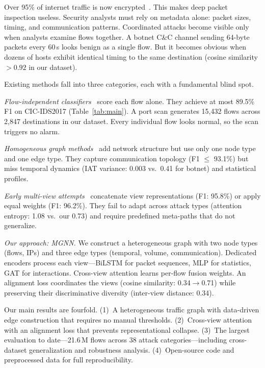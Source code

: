 \documentclass[conference]{IEEEtran}
\begin{document}
Over 95\% of internet traffic is now encrypted~\cite{google2024https}. This makes deep packet inspection useless. Security analysts must rely on metadata alone: packet sizes, timing, and communication patterns. Coordinated attacks become visible only when analysts examine flows together. A botnet C\&C channel sending 64-byte packets every 60\,s looks benign as a single flow. But it becomes obvious when dozens of hosts exhibit identical timing to the same destination (cosine similarity $>0.92$ in our dataset).

Existing methods fall into three categories, each with a fundamental blind spot.

\textit{Flow-independent classifiers}~\cite{sharafaldin2018cic,chen2016xgboost,lotfollahi2020deep,mirsky2018kitsune} score each flow alone. They achieve at most 89.5\% F1 on CIC-IDS2017 (Table~\ref{tab:main}). A port scan generates 15,432 flows across 2,847 destinations in our dataset\@. Every individual flow looks normal, so the scan triggers no alarm.

\textit{Homogeneous graph methods}~\cite{zheng2022gdn} add network structure but use only one node type and one edge type. They capture communication topology (F1 $\le$ 93.1\%) but miss temporal dynamics (IAT variance: 0.003 vs.\ 0.41 for botnet) and statistical profiles.

\textit{Early multi-view attempts}~\cite{zhang2021magnn} concatenate view representations (F1: 95.8\%) or apply equal weights (F1: 96.2\%). They fail to adapt across attack types (attention entropy: 1.08 vs.\ our 0.73) and require predefined meta-paths that do not generalize.

\textit{Our approach: MGNN.} We construct a heterogeneous graph with two node types (flows, IPs) and three edge types (temporal, volume, communication). Dedicated encoders process each view---BiLSTM for packet sequences, MLP for statistics, GAT for interactions. Cross-view attention learns per-flow fusion weights. An alignment loss coordinates the views (cosine similarity: 0.34$\to$0.71) while preserving their discriminative diversity (inter-view distance: 0.34).

Our main results are fourfold. (1)~A heterogeneous traffic graph with data-driven edge construction that requires no manual thresholds. (2)~Cross-view attention with an alignment loss that prevents representational collapse. (3)~The largest evaluation to date---21.6\,M flows across 38 attack categories---including cross-dataset generalization and robustness analysis. (4)~Open-source code and preprocessed data for full reproducibility.
\end{document}
